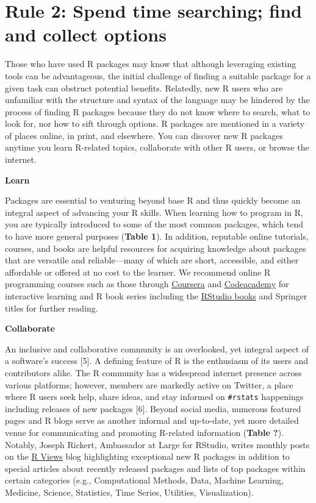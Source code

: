 \documentclass[10pt,letterpaper]{article}
\begin{document}
\hypertarget{rule-2-spend-time-searching-find-and-collect-options}{%
\section{Rule 2: Spend time searching; find and collect
options}\label{rule-2-spend-time-searching-find-and-collect-options}}

Those who have used R packages may know that although leveraging
existing tools can be advantageous, the initial challenge of finding a
suitable package for a given task can obstruct potential benefits.
Relatedly, new R users who are unfamiliar with the structure and syntax
of the language may be hindered by the process of finding R packages
because they do not know where to search, what to look for, nor how to
sift through options. R packages are mentioned in a variety of places
online, in print, and elsewhere. You can discover new R packages anytime
you learn R-related topics, collaborate with other R users, or browse
the internet.

\textbf{Learn}

Packages are essential to venturing beyond base R and thus quickly
become an integral aspect of advancing your R skills. When learning how
to program in R, you are typically introduced to some of the most common
packages, which tend to have more general purposes (\textbf{Table 1}).
In addition, reputable online tutorials, courses, and books are helpful
resources for acquiring knowledge about packages that are versatile and
reliable---many of which are short, accessible, and either affordable or
offered at no cost to the learner. We recommend online R programming
courses such as those through
\href{https://www.coursera.org/learn/r-programming}{Coursera} and
\href{https://www.codecademy.com/learn/learn-r}{Codeacademy} for
interactive learning and R book series including the
\href{https://rstudio.com/resources/books/}{RStudio books} and Springer
titles for further reading.

\textbf{Collaborate}

An inclusive and collaborative community is an overlooked, yet integral
aspect of a software's success {[}5{]}. A defining feature of R is the
enthusiasm of its users and contributors alike. The R community has a
widespread internet presence across various platforms; however, members
are markedly active on Twitter, a place where R users seek help, share
ideas, and stay informed on \texttt{\#rstats} happenings including
releases of new packages {[}6{]}. Beyond social media, numerous featured
pages and R blogs serve as another informal and up-to-date, yet more
detailed venue for communicating and promoting R-related information
(\textbf{Table ?}). Notably, Joseph Rickert, Ambassador at Large for
RStudio, writes monthly posts on the
\href{https://rviews.rstudio.com/}{R Views} blog highlighting
exceptional new R packages in addition to special articles about
recently released packages and lists of top packages within certain
categories (e.g., Computational Methods, Data, Machine Learning,
Medicine, Science, Statistics, Time Series, Utilities, Visualization).
\end{document}
